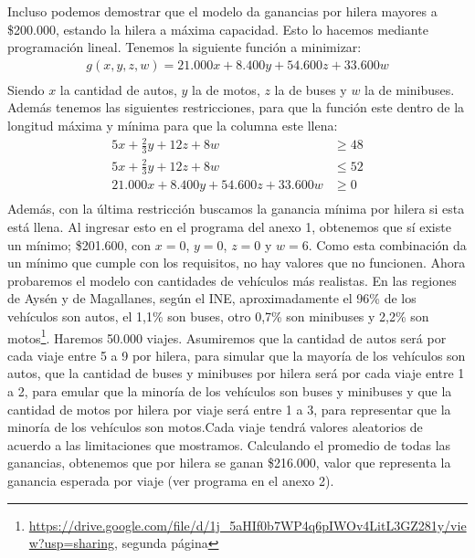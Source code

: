\documentclass[a4paper]{article}
\begin{document}
Incluso podemos demostrar que el modelo da ganancias por hilera mayores a \$200.000, estando la hilera a máxima capacidad. Esto lo hacemos mediante programación lineal. Tenemos la siguiente función a minimizar: 
\begin{align*}
   g(x,y,z,w) = 21.000x + 8.400y + 54.600z + 33.600w\\
\end{align*}
Siendo $x$ la cantidad de autos, $y$ la de motos, $z$ la de buses y $w$ la de minibuses. Además tenemos las siguientes restricciones, para que la función este dentro de la longitud máxima y mínima para que la columna este llena: 
\begin{align*}
    5x+\frac{2}{3}y+12z+8w &\geq 48\\
    5x+\frac{2}{3}y+12z+8w &\leq 52\\
    21.000x + 8.400y + 54.600z + 33.600w &\geq 0\\
\end{align*}
Además, con la última restricción buscamos la ganancia mínima por hilera si esta está llena. Al ingresar esto en el programa del anexo 1, obtenemos que sí existe un mínimo; \$201.600, con $x = 0$, $y = 0$, $z = 0$ y $w = 6$.  Como esta combinación da un mínimo que cumple con los requisitos, no hay valores que no funcionen. \newline\newline Ahora probaremos el modelo con cantidades de vehículos más realistas. En las regiones de Aysén y de Magallanes, según el INE, aproximadamente el 96\% de los vehículos son autos, el 1,1\% son buses, otro 0,7\% son minibuses y 2,2\% son motos\footnote{\url{ https://drive.google.com/file/d/1j_5aHIf0b7WP4q6pIWOv4LitL3GZ281y/view?usp=sharing}, segunda página}. Haremos 50.000 viajes. Asumiremos que la cantidad de autos será por cada viaje entre 5 a 9 por hilera, para simular que la mayoría de los vehículos son autos, que la cantidad de buses y minibuses por hilera será por cada viaje entre 1 a 2, para emular que la minoría de los vehículos son buses y minibuses y que la cantidad de motos por hilera por viaje será entre 1 a 3, para representar que la minoría de los vehículos son motos.\newline\newline Cada viaje tendrá valores aleatorios de acuerdo a las limitaciones que mostramos. Calculando el promedio de todas las ganancias, obtenemos que por hilera se ganan \$216.000, valor que representa la ganancia esperada por viaje (ver programa en el anexo 2).
\end{document}
